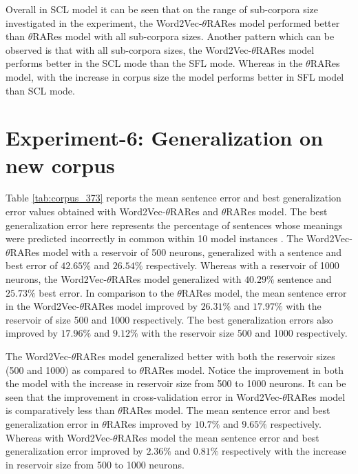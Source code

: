 Overall in SCL model it can be seen that on the range of sub-corpora size investigated in the experiment, the Word2Vec-$\theta$RARes model performed better than $\theta$RARes model with all sub-corpora sizes. Another pattern which can be observed is that with all sub-corpora sizes, the Word2Vec-$\theta$RARes model performs better in the SCL mode than the SFL mode. Whereas in the $\theta$RARes model, with the increase in corpus size the model performs better in SFL model than SCL mode. 

\section{Experiment-6: Generalization on new corpus}

Table \ref{tab:corpus_373} reports the mean sentence error and best generalization error values obtained with Word2Vec-$\theta$RARes and $\theta$RARes model. The best generalization error here represents the percentage of sentences whose meanings were predicted incorrectly in common within 10 model instances \cite{tra:xavier_hri}. The Word2Vec-$\theta$RARes model with a reservoir of 500 neurons, generalized with a sentence and best error of $42.65 \%$ and $26.54 \%$ respectively. Whereas with a reservoir of 1000 neurons, the Word2Vec-$\theta$RARes model generalized with $40.29 \%$ sentence and $25.73 \%$  best error. In comparison to the $\theta$RARes model, the mean sentence error in the Word2Vec-$\theta$RARes model improved by $26.31\%$ and $17.97\%$  with the reservoir of size 500 and 1000 respectively. The best generalization errors also improved by $17.96 \%$ and $9.12 \%$ with the reservoir size 500 and 1000 respectively.

The Word2Vec-$\theta$RARes model generalized better with both the reservoir sizes (500 and 1000) as compared to $\theta$RARes model. Notice the improvement in both the model with the increase in reservoir size from 500 to 1000 neurons. It can be seen that the improvement in cross-validation error in Word2Vec-$\theta$RARes model is comparatively less than $\theta$RARes model. The mean sentence error and best generalization error in $\theta$RARes improved by $10.7 \%$ and $9.65 \%$ respectively. Whereas with Word2Vec-$\theta$RARes model the mean sentence error and best generalization error improved by $2.36 \%$ and $0.81\%$ respectively with the increase in reservoir size from 500 to 1000 neurons.     

